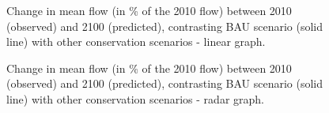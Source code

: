 {%
\begin{figure}[h!]
 \caption{Change in mean flow (in \% of the 2010 flow) between 2010 (observed) and 2100 (predicted), contrasting BAU scenario (solid line) with other conservation scenarios - linear graph.}
 \label{fig:flow_linear_2}
\end{figure}

\begin{figure}[h!]
 \caption{Change in mean flow (in \% of the 2010 flow) between 2010 (observed) and 2100 (predicted), contrasting BAU scenario (solid line) with other conservation scenarios - radar graph.}
 \label{fig:flow_radar_2}
\end{figure}

}
